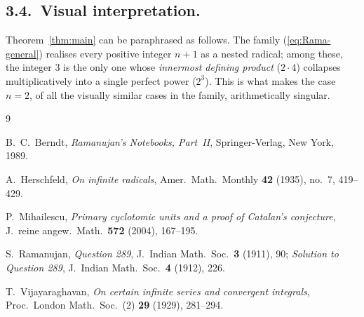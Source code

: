 \documentclass[12pt,a4paper]{article}
\begin{document}
\subsection*{3.4.\ Visual interpretation.}

Theorem~\ref{thm:main} can be paraphrased as follows.  The family
(\ref{eq:Rama-general}) realises every positive integer $n+1$ as a
nested radical; among these, the integer $3$ is the only one whose
\emph{innermost defining product} ($2 \cdot 4$) collapses
multiplicatively into a single perfect power ($2^3$).  This is what
makes the case $n=2$, of all the visually similar cases in the family,
arithmetically singular.

\begin{thebibliography}{9}

B.\ C.\ Berndt,
\emph{Ramanujan's Notebooks, Part~II},
Springer-Verlag, New York, 1989.

A.\ Herschfeld,
\emph{On infinite radicals},
Amer.\ Math.\ Monthly \textbf{42} (1935), no.\ 7, 419--429.

P.\ Mihailescu,
\emph{Primary cyclotomic units and a proof of Catalan's conjecture},
J.\ reine angew.\ Math.\ \textbf{572} (2004), 167--195.

S.\ Ramanujan,
\emph{Question 289},
J.\ Indian Math.\ Soc.\ \textbf{3} (1911), 90;
\emph{Solution to Question 289},
J.\ Indian Math.\ Soc.\ \textbf{4} (1912), 226.

T.\ Vijayaraghavan,
\emph{On certain infinite series and convergent integrals},
Proc.\ London Math.\ Soc.\ (2) \textbf{29} (1929), 281--294.

\end{thebibliography}
\end{document}
